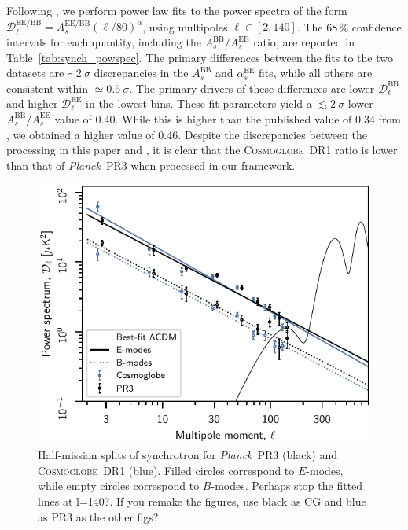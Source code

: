 \documentclass[twocolumn]{../../common/aa}
\def\Planck{\emph{Planck}}
\newcommand{\red}[0]{\color{red}}
\newcommand{\cosmoglobe}{\textsc{Cosmoglobe}}
\begin{document}
Following \citet{planck2016-l04}, we perform power law fits to the power spectra of the form $\mathcal D_\ell^\mathrm{EE/BB}=A_s^{\mathrm{EE/BB}}(\ell/80)^\alpha$, using multipoles $\ell\in[2,140]$. The 68\,\% confidence intervals for each quantity, including the $A_s^\mathrm{BB}/A_s^\mathrm{EE}$ ratio, are reported in Table~\ref{tab:synch_powspec}. The primary differences between the fits to the two datasets are $\sim2~\sigma$ discrepancies in the $A_s^\mathrm{BB}$ and $\alpha_s^\mathrm{EE}$ fits, while all others are consistent within $\simeq0.5~\sigma$. The primary drivers of these differences are lower $\mathcal D_\ell^\mathrm{BB}$ and higher $\mathcal D_\ell^\mathrm{EE}$ in the lowest bins.
These fit parameters yield a $\lesssim2~\sigma$ lower $A_s^\mathrm{BB}/A_s^\mathrm{EE}$ value of $0.40$. While this is higher than the published value of 0.34 from \citet{planck2016-l04}, we obtained a higher value of 0.46. Despite the discrepancies between the processing in this paper and \citet{planck2016-l04}, it is clear that the \cosmoglobe\ DR1 ratio is lower than that of \Planck\ PR3 when processed in our framework.

\begin{figure}
        \centering
	\includegraphics[width=\linewidth]{figures/cls_synch_ratio.pdf}
        \caption{
		Half-mission splits of synchrotron for \Planck\ PR3 (black) and \cosmoglobe\ DR1 (blue). Filled circles correspond to $E$-modes, while empty circles correspond to $B$-modes. {\red Perhaps stop the fitted lines at l=140?. If you remake the figures, use black as CG and blue as PR3 as the other figs?}
        }
        \label{fig:spectra}
\end{figure}
\end{document}
